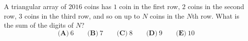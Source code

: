 A triangular array of $2016$ coins has $1$ coin in the first row, $2$ coins in the second row, $3$ coins in the third row, and so on up to $N$ coins in the $N$th row. What is the sum of the digits of $N$?
\[\textbf{(A)}\ 6\qquad\textbf{(B)}\ 7\qquad\textbf{(C)}\ 8\qquad\textbf{(D)}\ 9\qquad\textbf{(E)}\ 10\]
